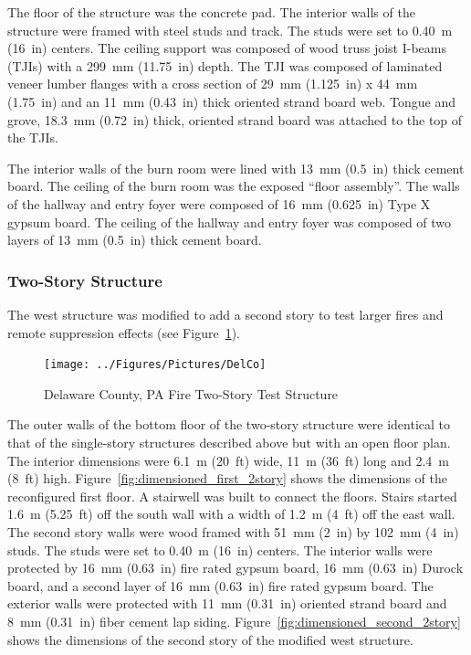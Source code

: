 \documentclass[12pt,oneside]{book}
\begin{document}
The floor of the structure was the concrete pad. The interior walls of the structure were framed with steel studs and track. The studs were set to 0.40~m (16~in) centers. The ceiling support was composed of wood truss joist I-beams (TJIs) with a 299~mm (11.75~in) depth. The TJI was composed of laminated veneer lumber flanges with a cross section of 29~mm (1.125~in) x 44~mm (1.75~in) and an 11~mm (0.43~in) thick oriented strand board web. Tongue and grove, 18.3~mm (0.72~in) thick, oriented strand board was attached to the top of the TJIs.

The interior walls of the burn room were lined with 13~mm (0.5~in) thick cement board. The ceiling of the burn room was the exposed ``floor assembly''. The walls of the hallway and entry foyer were composed of 16~mm (0.625~in) Type X gypsum board. The ceiling of the hallway and entry foyer was composed of two layers of 13~mm (0.5~in) thick cement board.

\subsubsection*{Two-Story Structure}

The west structure was modified to add a second story to test larger fires and remote suppression effects (see Figure~\ref{fig:delco_2story}).

\begin{figure}[!ht]
	\texttt{[image: ../Figures/Pictures/DelCo]}
	\caption{Delaware County, PA Fire Two-Story Test Structure}
	\label{fig:delco_2story}
\end{figure}

The outer walls of the bottom floor of the two-story structure were identical to that of the single-story structures described above but with an open floor plan. The interior dimensions were 6.1~m (20~ft) wide, 11~m (36~ft) long and 2.4~m (8~ft) high. Figure~\ref{fig:dimensioned_first_2story} shows the dimensions of the reconfigured first floor. A stairwell was built to connect the floors. Stairs started 1.6~m (5.25~ft) off the south wall with a width of 1.2~m (4~ft) off the east wall. The second story walls were wood framed with 51~mm (2~in) by 102~mm (4~in) studs. The studs were set to 0.40~m (16~in) centers. The interior  walls were protected by 16~mm (0.63~in) fire rated gypsum board, 16~mm (0.63~in) Durock board, and a second layer of 16~mm (0.63~in) fire rated gypsum board. The exterior walls were protected with 11~mm (0.31~in) oriented strand board and 8~mm (0.31~in) fiber cement lap siding. Figure~\ref{fig:dimensioned_second_2story} shows the dimensions of the second story of the modified west structure.
\end{document}
